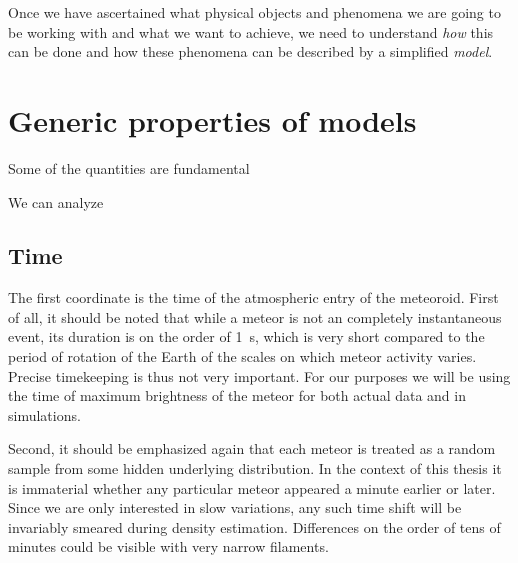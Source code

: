 
Once we have ascertained what physical objects and phenomena we are going to be working with and what we want to achieve,
we need to understand \emph{how} this can be done and how these phenomena can be described by a simplified \emph{model}.


\section{Generic properties of models} \label{g}
    Some of the quantities are fundamental 

    We can analyze 

    \subsection{Time} \label{mst}
        The first coordinate is the time of the atmospheric entry of the meteoroid.
        First of all, it should be noted that while a meteor is not an completely instantaneous event,
        its duration is on the order of \SI{1}{\second}, which is very short compared to the
        period of rotation of the Earth of the scales on which meteor activity varies.
        Precise timekeeping is thus not very important.
        For our purposes we will be using the time of maximum brightness
        of the meteor for both actual data and in simulations.

        Second, it should be emphasized again that each meteor is treated
        as a random sample from some hidden underlying distribution.
        In the context of this thesis it is immaterial whether any particular meteor
        appeared a minute earlier or later. Since we are only interested in slow variations,
        any such time shift will be invariably smeared during density estimation.
        Differences on the order of tens of minutes could be visible with very narrow filaments.

